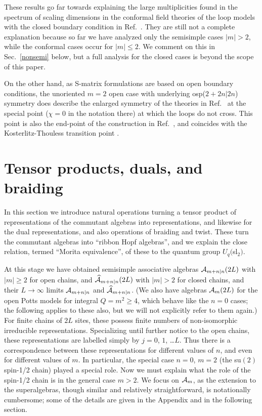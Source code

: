 \documentclass[twocolumn,floats,pra]{revtex4}
\def \cA {{\cal A}}
\begin{document}
These results go far towards explaining the large multiplicities
found in the spectrum of scaling dimensions in the conformal field
theories of the loop models with the closed boundary condition in
Ref.\ \cite{rs}. They are still not a complete explanation because
so far we have analyzed only the semisimple cases $|m|>2$, while
the conformal cases occur for $|m|\leq2$. We comment on this in
Sec.\ \ref{nonsemi} below, but a full analysis for the closed
cases is beyond the scope of this paper.

On the other hand, as S-matrix formulations are based on open
boundary conditions, the unoriented $m=2$ open case with
underlying osp($2+2n|2n$) symmetry does describe the enlarged
symmetry of the theories in Ref.\ \cite{polchinski} at the special
point ($\chi=0$ in the notation there) at which the loops do not
cross. This point is also the end-point of the construction in
Ref.\ \cite{polchinski}, and coincides with the
Kosterlitz-Thouless transition point \cite{rs}.


\section{Tensor products, duals, and braiding}
\label{tens}

In this section we introduce natural operations turning a tensor
product of representations of the commutant algebras into
representations, and likewise for the dual representations, and
also operations of braiding and twist. These turn the commutant
algebras into ``ribbon Hopf algebras'', and we explain the close
relation, termed ``Morita equivalence'', of these to the quantum
group $U_q($sl$_2)$.

At this stage we have obtained semisimple associative algebras
$\cA_{m+n|n}(2L)$ with $|m|\geq 2$ for open chains, and
$\widehat\cA_{m+n|n}(2L)$ with $|m|>2$ for closed chains, and
their $L\to\infty$ limits $\cA_{m+n|n}$ and $\widehat\cA_{m+n|n}$.
(We also have algebras $\cA_m(2L)$ for the open Potts models for
integral $Q=m^2\geq 4$, which behave like the $n=0$ cases; the
following applies to these also, but we will not explicitly refer
to them again.) For finite chains of $2L$ sites, these possess
finite numbers of non-isomorphic irreducible representations.
Specializing until further notice to the open chains, these
representations are labelled simply by $j=0$, $1$, \ldots $L$.
Thus there is a correspondence between these representations for
different values of $n$, and even for different values of $m$. In
particular, the special case $n=0$, $m=2$ (the su$(2)$ spin-1/2
chain) played a special role. Now we must explain what the role of
the spin-1/2 chain is in the general case $m>2$. We focus on
$\cA_m$, as the extension to the superalgebras, though similar and
relatively straightforward, is notationally cumbersome; some of
the details are given in the Appendix and in the following
section.
\end{document}
